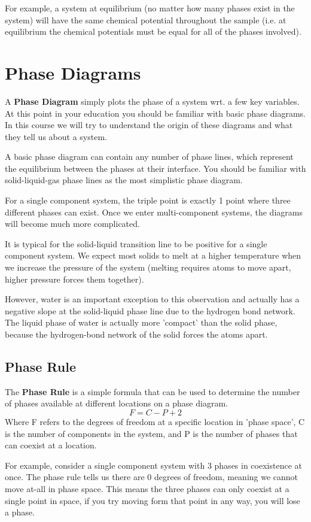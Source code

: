 \documentclass{article}
\newcommand{\be}{\begin{equation}}
\newcommand{\ee}{\end{equation}}
\begin{document}
For example, a system at equilibrium (no matter how many phases exist in the system) will have the same chemical potential throughout the sample (i.e. at equilibrium the chemical potentials must be equal for all of the phases involved). 

\section*{Phase Diagrams}
A \textbf{Phase Diagram} simply plots the phase of a system wrt. a few key variables. 
At this point in your education you should be familiar with basic phase diagrams. 
In this course we will try to understand the origin of these diagrams and what they tell us about a system. 

A basic phase diagram can contain any number of phase lines, which represent the equilibrium between the phases at their interface. 
You should be familiar with solid-liquid-gas phase lines as the most simplistic phase diagram. 

For a  single component system, the triple point is exactly 1 point where three different phases can exist. 
Once we enter multi-component systems, the diagrams will become much more complicated. 

It is typical for the solid-liquid transition line to be positive for a single component system. 
We expect most solids to melt at a higher temperature when we increase the pressure of the system (melting requires atoms to move apart, higher pressure forces them together).

However, water is an important exception to this observation and actually has a negative slope at the solid-liquid phase line due to the hydrogen bond network. 
The liquid phase of water is actually more 'compact' than the solid phase, because the hydrogen-bond network of the solid forces the atoms apart. 

\subsection*{Phase Rule}
The \textbf{Phase Rule} is a simple formula that can be used to determine the number of phases available at different locations on a phase diagram. 
\be
F = C - P + 2
\ee
Where F refers to the degrees of freedom at a specific location in 'phase space', C is the number of components in the system, and P is the number of phases that can coexist at a location. 

For example, consider a single component system with 3 phases in coexistence at once.
The phase rule tells us there are 0 degrees of freedom, meaning we cannot move at-all in phase space. 
This means the three phases can only coexist at a single point in space, if you try moving form that point in any way, you will lose a phase. 
\end{document}
